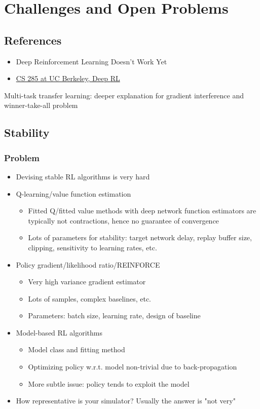 \chapter{Challenges and Open Problems}

\section{References}
\begin{itemize}
	\item Deep Reinforcement Learning Doesn't Work Yet \cite{irpan18}
	\item \href{http://rail.eecs.berkeley.edu/deeprlcourse/static/slides/lec-23.pdf}{CS 285 at UC Berkeley, Deep \ac{RL}}
\end{itemize}
Multi-task transfer learning: deeper explanation for gradient interference and winner-take-all problem

\section{Stability}
\subsection{Problem}
\begin{itemize}
	\item Devising stable RL algorithms is very hard
	\item Q-learning/value function estimation
	\begin{itemize}
		\item Fitted Q/fitted value methods with deep network function estimators are typically not contractions, hence no guarantee of convergence
		\item Lots of parameters for stability: target network delay, replay buffer size, clipping, sensitivity to learning rates, etc.
	\end{itemize}	
	\item Policy gradient/likelihood ratio/REINFORCE
	\begin{itemize}
		\item Very high variance gradient estimator
		\item Lots of samples, complex baselines, etc.
		\item Parameters: batch size, learning rate, design of baseline
	\end{itemize}	
	\item Model-based RL algorithms
	\begin{itemize}
		\item Model class and fitting method
		\item Optimizing policy w.r.t. model non-trivial due to back-propagation
		\item More subtle issue: policy tends to exploit the model
	\end{itemize}
	\item How representative is your simulator? Usually the answer is "not very"
\end{itemize}
